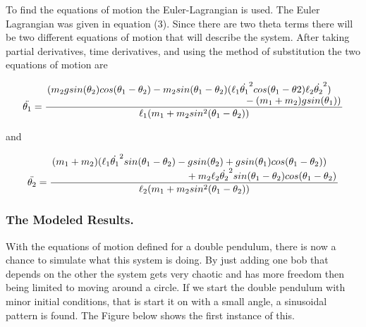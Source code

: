 \documentclass[runningheads]{llncs}
\begin{document}
To find the equations of motion the Euler-Lagrangian is used. The Euler Lagrangian was given in equation (3). Since there are two theta terms there will be two different equations of motion that will describe the system. After taking partial derivatives, time derivatives, and using the method of substitution the two equations of motion are 

\begin{multline}
    \ddot{\theta_{1}} = \frac{\splitfrac{(m_{2}gsin(\theta_{2})cos(\theta_{1} - \theta_{2}) - m_{2}sin(\theta_{1} -  \theta_{2}) (\ell_{1}\dot{\theta_{1}}^{2}cos(\theta_{1}- \theta{2}) \ell_{2}\dot{\theta_{2}}^{2})}{  - (m_{1} + m_{2})gsin(\theta_{1}))}}{\ell_{1}(m_{1} + m_{2}sin^{2}(\theta_{1} - \theta_{2}))}
\end{multline}

and

\begin{equation}
   \ddot{\theta_{2}} = \frac{\splitfrac{(m_{1} + m_{2})(\ell_{1}\dot{\theta_{1}}^{2}sin(\theta_{1} - \theta_{2}) - gsin(\theta_{2}) + gsin(\theta_{1})cos(\theta_{1} - \theta_{2}))}{  + m_{2}\ell_{2}\dot{\theta_{2}}^{2}sin(\theta_{1} - \theta_{2})cos(\theta_{1} - \theta_{2})}}{\ell_{2}(m_{1} + m_{2}sin^{2}(\theta_{1} - \theta_{2}))}
\end{equation}

\subsubsection{The Modeled Results.}

With the equations of motion defined for a double pendulum, there is now a chance to simulate what this system is doing. By just adding one bob that depends on the other the system gets very chaotic and has more freedom then being limited to moving around a circle. If we start the double pendulum with minor initial conditions, that is start it on with a small angle, a sinusoidal pattern is found. The Figure below shows the first instance of this.
\end{document}
